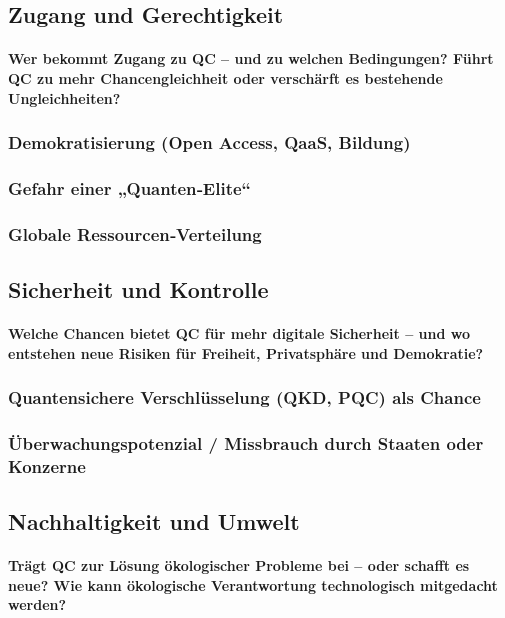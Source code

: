 \subsection{Zugang und Gerechtigkeit}
\paragraph{Wer bekommt Zugang zu QC – und zu welchen Bedingungen? 
Führt QC zu mehr Chancengleichheit oder verschärft es bestehende Ungleichheiten?
}

\subsubsection{Demokratisierung (Open Access, QaaS, Bildung)}
\subsubsection{Gefahr einer „Quanten‑Elite“}
\subsubsection{Globale Ressourcen‑Verteilung}

\subsection{Sicherheit und Kontrolle}
\paragraph{Welche Chancen bietet QC für mehr digitale Sicherheit – und wo entstehen neue Risiken für Freiheit, Privatsphäre und Demokratie?}

\subsubsection{Quantensichere Verschlüsselung (QKD, PQC) als Chance}
\subsubsection{Überwachungspotenzial / Missbrauch durch Staaten oder Konzerne}

\subsection{Nachhaltigkeit und Umwelt}
\paragraph{Trägt QC zur Lösung ökologischer Probleme bei – oder schafft es neue? 
Wie kann ökologische Verantwortung technologisch mitgedacht werden?
}

